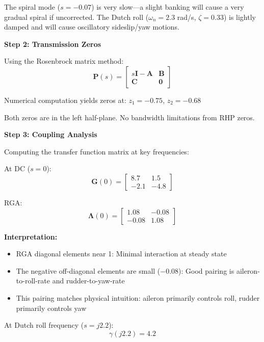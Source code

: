 The spiral mode ($s = -0.07$) is very slow---a slight banking will cause a very gradual spiral if uncorrected. The Dutch roll ($\omega_n = 2.3$ rad/s, $\zeta = 0.33$) is lightly damped and will cause oscillatory sideslip/yaw motions.

\textbf{Step 2: Transmission Zeros}

Using the Rosenbrock matrix method:
\begin{equation}
\mathbf{P}(s) = \begin{bmatrix} s\mathbf{I} - \mathbf{A} & \mathbf{B} \\ \mathbf{C} & \mathbf{0} \end{bmatrix}
\end{equation}

Numerical computation yields zeros at: $z_1 = -0.75$, $z_2 = -0.68$

Both zeros are in the left half-plane. No bandwidth limitations from RHP zeros.

\textbf{Step 3: Coupling Analysis}

Computing the transfer function matrix at key frequencies:

At DC ($s = 0$):
\begin{equation}
\mathbf{G}(0) = \begin{bmatrix} 8.7 & 1.5 \\ -2.1 & -4.8 \end{bmatrix}
\end{equation}

RGA:
\begin{equation}
\boldsymbol{\Lambda}(0) = \begin{bmatrix} 1.08 & -0.08 \\ -0.08 & 1.08 \end{bmatrix}
\end{equation}

\textbf{Interpretation:}
\begin{itemize}
\item RGA diagonal elements near 1: Minimal interaction at steady state
\item The negative off-diagonal elements are small ($-0.08$): Good pairing is aileron-to-roll-rate and rudder-to-yaw-rate
\item This pairing matches physical intuition: aileron primarily controls roll, rudder primarily controls yaw
\end{itemize}

At Dutch roll frequency ($s = j2.2$):
\begin{equation}
\gamma(j2.2) = 4.2
\end{equation}

